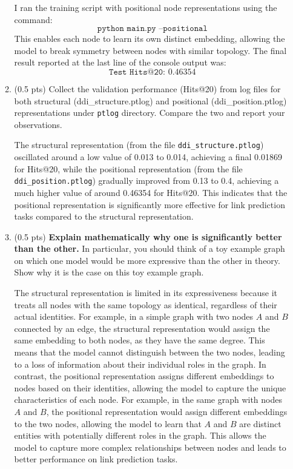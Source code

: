 \begin{enumerate}
\begin{enumerate}
        I ran the training script with positional node representations using the command:
\[
\texttt{python main.py --positional}
\]
This enables each node to learn its own distinct embedding, allowing the model to break symmetry between nodes with similar topology. The final result reported at the last line of the console output was:
\[
\texttt{Test Hits@20: } 0.46354
\]

        \item (0.5 pts)
        Collect the validation performance (Hits@20) from log files for both
        structural (ddi\_structure.ptlog) and positional (ddi\_position.ptlog)
        representations under \texttt{ptlog} directory. Compare the two and report your observations.

        The structural representation (from the file
        \texttt{ddi\_structure.ptlog}) oscillated around a low value of 0.013 to
        0.014, achieving a final 0.01869 for Hits@20, while the positional
        representation (from the file \texttt{ddi\_position.ptlog}) gradually
        improved from 0.13 to 0.4, achieving a much higher value of around
        0.46354 for Hits@20. This indicates that the positional representation
        is significantly more effective for link prediction tasks compared to
        the structural representation.

        \item (0.5 pts)
        {\bf Explain mathematically why one is significantly better than the other.} In particular, you should think of a toy example graph on which one model would be more expressive than the other in theory. Show why it is the case on this toy example graph.

        The structural representation is limited in its expressiveness because
        it treats all nodes with the same topology as identical, regardless of
        their actual identities. For example, in a simple graph with two nodes
        $A$ and $B$ connected by an edge, the structural representation would
        assign the same embedding to both nodes, as they have the same degree.
        This means that the model cannot distinguish between the two nodes,
        leading to a loss of information about their individual roles in the
        graph.  In contrast, the positional representation assigns different
        embeddings to nodes based on their identities, allowing the model to
        capture the unique characteristics of each node. For example, in the
        same graph with nodes $A$ and $B$, the positional representation would
        assign different embeddings to the two nodes, allowing the model to
        learn that $A$ and $B$ are distinct entities with potentially different
        roles in the graph. This allows the model to capture more complex
        relationships between nodes and leads to better performance on link
        prediction tasks.


\end{enumerate}
\end{enumerate}
